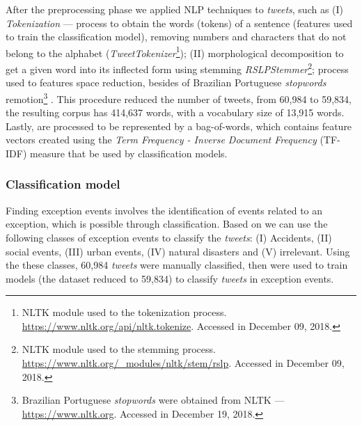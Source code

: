 \documentclass[runningheads]{llncs}
\begin{document}
After the preprocessing phase we applied NLP techniques to \textit{tweets}, such as (I) \textit{Tokenization} --- process to obtain the words (tokens) of a sentence (features used to train the classification model), removing numbers and characters that do not belong to the alphabet (\textit{TweetTokenizer}\footnote{NLTK module used to the tokenization process. \url{https://www.nltk.org/api/nltk.tokenize}. Accessed in December 09, 2018.}); (II) morphological decomposition to get a given word into its inflected form using stemming \textit{RSLPStemmer}\footnote{NLTK module used to the stemming process. \url{https://www.nltk.org/\_modules/nltk/stem/rslp}. Accessed in December 09, 2018.}; process used to features space reduction, besides of Brazilian Portuguese \textit{stopwords} remotion\footnote{Brazilian Portuguese \textit{stopwords} were obtained from NLTK --- \url{https://www.nltk.org}. Accessed in December 19, 2018.} \cite{Setiawan2017, nadkarni2011natural, Korenius, roy2017understanding, collobert2011natural}. This procedure reduced the number of tweets, from 60,984 to 59,834,  the resulting corpus has 414,637 words, with a vocabulary size of 13,915 words. Lastly, are processed to be represented by a bag-of-words, which contains feature vectors created using the \textit{Term Frequency - Inverse Document Frequency} (TF-IDF) measure that be used by classification models.

\subsubsection{Classification model}
\label{featuresEng}




Finding exception events involves the identification of events related to an exception, which is possible through classification. Based on \cite{Itoh2016, Chen2016, Lecue2014, Gal-Tzur2014} we can use the following classes of exception events to classify the \textit{tweets}: (I) Accidents, (II) social events, (III) urban events, (IV) natural disasters and (V) irrelevant. Using the these classes, 60,984 \textit{tweets} were manually classified, then were used to train models (the dataset reduced to 59,834) to classify \textit{tweets} in exception events. 
\end{document}
